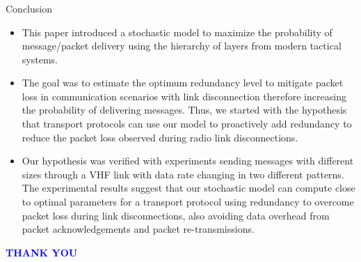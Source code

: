 \documentclass{beamer}
\begin{document}
\begin{frame}[fragile]
\frametitle{}
\begin{block}{Conclusion}
\begin{itemize}
    \item This paper introduced a stochastic model to maximize the probability of message/packet delivery using the hierarchy of layers from modern tactical systems.
    \item The goal was to estimate the optimum redundancy level to mitigate packet loss in communication scenarios with link disconnection therefore increasing the probability of delivering messages. Thus, we started with the hypothesis that transport protocols can use our model to proactively add redundancy to reduce the packet loss observed during radio link disconnections.
    \item Our hypothesis was verified with experiments sending messages with different sizes through a VHF link with data rate changing in two different patterns. The experimental results suggest that our stochastic model can compute close to optimal parameters for a transport protocol using redundancy to overcome packet loss during link disconnections, also avoiding data overhead from packet acknowledgements and packet re-transmissions.
\end{itemize}
\end{block}
\end{frame}

\begin{frame}[fragile]
   \centering
    \textcolor{blue}{\Huge{\textbf{THANK YOU}}}
 \begin{figure}
    \label{logo}
\end{figure}  
\end{frame}
\end{document}

